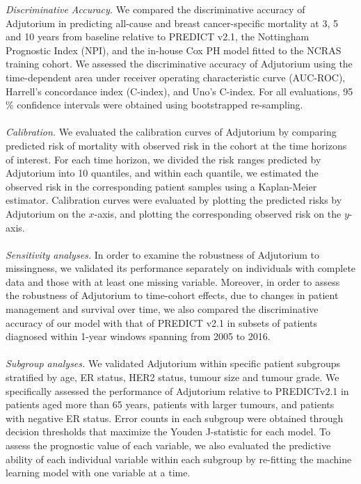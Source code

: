 \documentclass [PhD] {uclathes}
\begin{document}
{\it Discriminative Accuracy.} We compared the discriminative accuracy of Adjutorium in predicting all-cause and breast cancer-specific mortality at 3, 5 and 10 years from baseline relative to PREDICT v2.1,\cite{dos2017updated} the Nottingham Prognostic Index (NPI),\cite{fong2015nottingham} and the in-house Cox PH model fitted to the NCRAS training cohort. We assessed the discriminative accuracy of Adjutorium using the time-dependent area under receiver operating characteristic curve\cite{lambert2016summary} (AUC-ROC), Harrell’s concordance index\cite{harrell1996multivariable} (C-index), and Uno’s C-index.\cite{uno2011c} For all evaluations, 95$\%$ confidence intervals were obtained using bootstrapped re-sampling.\\ 
\\
{\it Calibration.} We evaluated the calibration curves of Adjutorium by comparing predicted risk of mortality with observed risk in the cohort at the time horizons of interest. For each time horizon, we divided the risk ranges predicted by Adjutorium into 10 quantiles, and within each quantile, we estimated the observed risk in the corresponding patient samples using a Kaplan-Meier estimator.\cite{d2003evaluation} Calibration curves were evaluated by plotting the predicted risks by Adjutorium on the $x$-axis, and plotting the corresponding observed risk on the $y$-axis.\\
\\
{\it Sensitivity analyses.} In order to examine the robustness of Adjutorium to missingness, we validated its performance separately on individuals with complete data and those with at least one missing variable. Moreover, in order to assess the robustness of Adjutorium to time-cohort effects, due to changes in patient management and survival over time, we also compared the discriminative accuracy of our model with that of PREDICT v2.1 in subsets of patients diagnosed within 1-year windows spanning from 2005 to 2016.\\ 
\\
{\it Subgroup analyses.} We validated Adjutorium within specific patient subgroups stratified by age, ER status, HER2 status, tumour size and tumour grade. We specifically assessed the performance of Adjutorium relative to PREDICTv2.1 in patients aged more than 65 years, patients with larger tumours, and patients with negative ER status. Error counts in each subgroup were obtained through decision thresholds that maximize the Youden J-statistic for each model. To assess the prognostic value of each variable, we also evaluated the predictive ability of each individual variable within each subgroup by re-fitting the machine learning model with one variable at a time.
\end{document}

